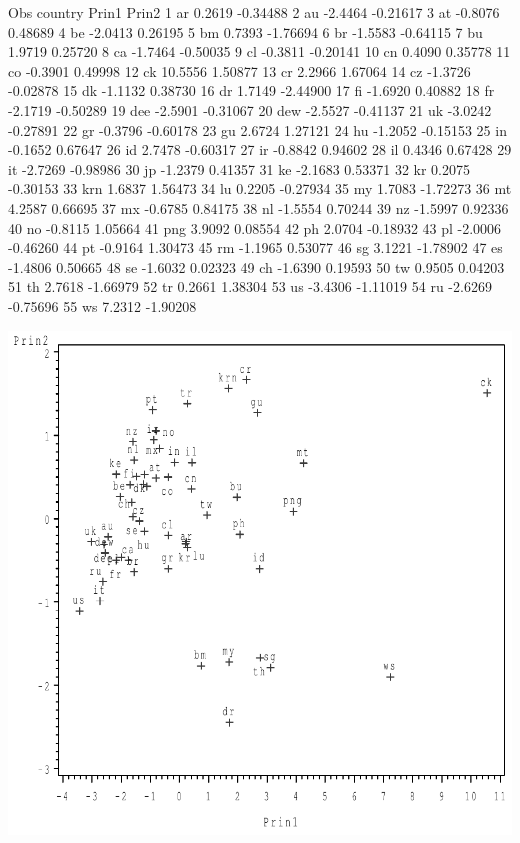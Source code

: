 \documentclass{article}
\begin{document}
\begin{Woutput}
Obs    country       Prin1      Prin2
  1      ar         0.2619    -0.34488
  2      au        -2.4464    -0.21617
  3      at        -0.8076     0.48689
  4      be        -2.0413     0.26195
  5      bm         0.7393    -1.76694
  6      br        -1.5583    -0.64115
  7      bu         1.9719     0.25720
  8      ca        -1.7464    -0.50035
  9      cl        -0.3811    -0.20141
 10      cn         0.4090     0.35778
 11      co        -0.3901     0.49998
 12      ck        10.5556     1.50877
 13      cr         2.2966     1.67064
 14      cz        -1.3726    -0.02878
 15      dk        -1.1132     0.38730
 16      dr         1.7149    -2.44900
 17      fi        -1.6920     0.40882
 18      fr        -2.1719    -0.50289
 19      dee       -2.5901    -0.31067
 20      dew       -2.5527    -0.41137
 21      uk        -3.0242    -0.27891
 22      gr        -0.3796    -0.60178
 23      gu         2.6724     1.27121
 24      hu        -1.2052    -0.15153
 25      in        -0.1652     0.67647
 26      id         2.7478    -0.60317
 27      ir        -0.8842     0.94602
 28      il         0.4346     0.67428
 29      it        -2.7269    -0.98986
 30      jp        -1.2379     0.41357
 31      ke        -2.1683     0.53371
 32      kr         0.2075    -0.30153
 33      krn        1.6837     1.56473
 34      lu         0.2205    -0.27934
 35      my         1.7083    -1.72273
 36      mt         4.2587     0.66695
 37      mx        -0.6785     0.84175
 38      nl        -1.5554     0.70244
 39      nz        -1.5997     0.92336
 40      no        -0.8115     1.05664
 41      png        3.9092     0.08554
 42      ph         2.0704    -0.18932
 43      pl        -2.0006    -0.46260
 44      pt        -0.9164     1.30473
 45      rm        -1.1965     0.53077
 46      sg         3.1221    -1.78902
 47      es        -1.4806     0.50665
 48      se        -1.6032     0.02323
 49      ch        -1.6390     0.19593
 50      tw         0.9505     0.04203
 51      th         2.7618    -1.66979
 52      tr         0.2661     1.38304
 53      us        -3.4306    -1.11019
 54      ru        -2.6269    -0.75696
 55      ws         7.2312    -1.90208
\end{Woutput}
\includegraphics[]{men_track_field-1-SAS-fig.pdf}
\end{document}

